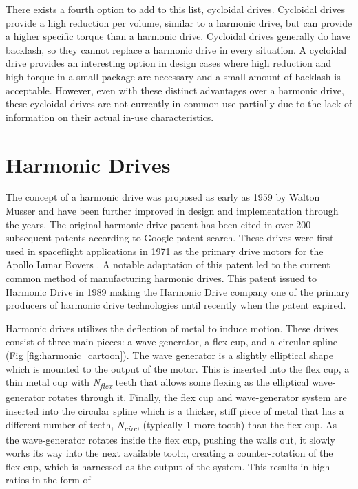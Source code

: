 There exists a fourth option to add to this list, cycloidal drives. 
Cycloidal drives provide a high reduction per volume, similar to a harmonic drive, but can provide a higher specific torque than a harmonic drive. 
Cycloidal drives generally do have backlash, so they cannot replace a harmonic drive in every situation. A cycloidal drive provides an interesting option in design cases where high reduction and high torque in a small package are necessary and a small amount of backlash is acceptable. 
However, even with these distinct advantages over a harmonic drive, these cycloidal drives are not currently in common use partially due to the lack of information on their actual in-use characteristics. 

\section{Harmonic Drives} \label{intro:harmonic}

The concept of a harmonic drive was proposed as early as 1959 by Walton Musser \cite{ref:harmonic_original} and have been further improved in design and implementation through the years. The original harmonic drive patent has been cited in over 200 subsequent patents according to Google patent search. These drives were first used in spaceflight applications in 1971 as the primary drive motors for the Apollo Lunar Rovers \cite{ref:harmonic_apollo}. A notable adaptation of this patent led to the current common method of manufacturing harmonic drives. This patent issued to Harmonic Drive in 1989 \cite{ref:harmonic_drive_co} making the Harmonic Drive company one of the primary producers of harmonic drive technologies until recently when the patent expired. 

Harmonic drives utilizes the deflection of metal to induce motion. These drives consist of three main pieces: a wave-generator, a flex cup, and a circular spline (Fig \ref{fig:harmonic_cartoon}). The wave generator is a slightly elliptical shape which is mounted to the output of the motor. This is inserted into the flex cup, a thin metal cup with \textit{N\textsubscript{flex}} teeth that allows some flexing as the elliptical wave-generator rotates through it. Finally, the flex cup and wave-generator system are inserted into the circular spline which is a thicker, stiff piece of metal that has a different number of teeth, \textit{N\textsubscript{circ}}, (typically 1 more tooth) than the flex cup. As the wave-generator rotates inside the flex cup, pushing the walls out, it slowly works its way into the next available tooth, creating a counter-rotation of the flex-cup, which is harnessed as the output of the system. This results in high ratios in the form of 

